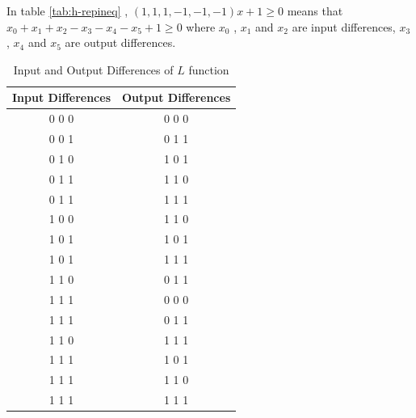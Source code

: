 In table \ref{tab:h-repineq} ,  $(1, 1, 1, -1, -1, -1) x + 1 \geq 0$ means that $ x_0 + x_1 + x_2 -x_3 - x_4 -x_5 +1 \geq 0 $ where $x_0$ , $x_1$ and $x_2$ are input differences, $x_3$ , $x_4$ and $x_5$ are output differences.  

\begin{table}[h]
\centering
\caption{Input and Output Differences of $L$ function}
\begin{tabular}{|c|c|}
\hhline{|=|=|}
\textbf{Input Differences} & \textbf{Output Differences} \\ \hline
0 0 0 & 0 0 0 \\ \hline
0 0 1 & 0 1 1 \\ \hline
0 1 0 & 1 0 1 \\ \hline
0 1 1 & 1 1 0 \\ \hline
0 1 1 & 1 1 1 \\ \hline
1 0 0 & 1 1 0 \\ \hline
1 0 1 & 1 0 1 \\ \hline
1 0 1 & 1 1 1 \\ \hline
1 1 0 & 0 1 1 \\ \hline
1 1 1 & 0 0 0 \\ \hline
1 1 1 & 0 1 1 \\ \hline
1 1 0 & 1 1 1 \\ \hline
1 1 1 & 1 0 1 \\ \hline
1 1 1 & 1 1 0 \\ \hline
1 1 1 & 1 1 1 \\ \hline
\end{tabular}

\label{tab:hreptab}
\end{table}

